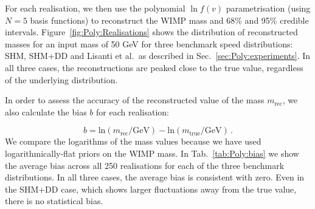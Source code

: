 For each realisation, we then use the polynomial $\ln f(v)$ parametrisation (using $N = 5$ basis functions) to reconstruct the WIMP mass and 68\% and 95\% credible intervals. Figure~\ref{fig:Poly:Realisations} shows the distribution of reconstructed masses for an input mass of 50 GeV for three benchmark speed distributions: SHM, SHM+DD and Lisanti et al.\, as described in Sec.~\ref{sec:Poly:experiments}. In all three cases, the reconstructions are peaked close to the true value, regardless of the underlying distribution. 



In order to assess the accuracy of the reconstructed value of the mass $m_\textrm{rec}$, we also calculate the bias $b$ for each realisation:

\begin{equation}
\label{eq:Poly:bias}
b = \textrm{ln}(m_\textrm{rec} / \textrm{GeV}) - \textrm{ln}(m_\textrm{true} / \textrm{GeV})\,.
\end{equation}
We compare the logarithms of the mass values because we have used logarithmically-flat priors on the WIMP mass. In Tab.~\ref{tab:Poly:bias} we show the average bias across all 250 realisations for each of the three benchmark distributions. In all three cases, the average bias is consistent with zero. Even in the SHM+DD case, which shows larger fluctuations away from the true value, there is no statistical bias.


